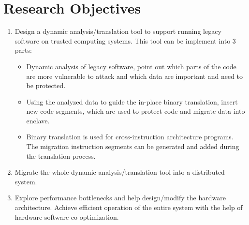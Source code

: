 \section{Research Objectives}
\begin{enumerate}
    \item Design a dynamic analysis/translation tool to support running
    legacy software on trusted computing systems. This tool can be implement
    into 3 parts:
    \begin{itemize}
        \item Dynamic analysis of legacy software, point out which parts of the code are
        more vulnerable to attack and which data are important and need to be protected.
        \item Using the analyzed data to guide the in-place binary translation,
        insert new code segments, which are used to protect code and migrate data into enclave.
        \item Binary translation is used for cross-instruction architecture programs. The migration
        instruction segments can be generated and added during the translation process.
    \end{itemize}
    \item Migrate the whole dynamic analysis/translation tool into a distributed system. 
    \item Explore performance bottlenecks and help design/modify the hardware architecture. 
    Achieve efficient operation of the entire system with the help of hardware-software
    co-optimization.
\end{enumerate}